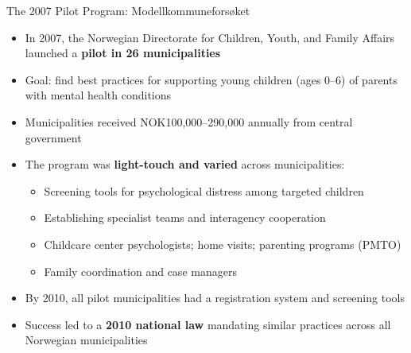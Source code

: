 \documentclass[aspectratio=169]{beamer}
\begin{document}
\begin{frame}{The 2007 Pilot Program: Modellkommunefors\o{}ket}
  \begin{itemize}
    \item In 2007, the Norwegian Directorate for Children, Youth, and Family Affairs launched a \textbf{pilot in 26 municipalities}
    \item Goal: find best practices for supporting young children (ages 0--6) of parents with mental health conditions
    \item Municipalities received NOK100,000--290,000 annually from central government
    \item The program was \textbf{light-touch and varied} across municipalities:
    \begin{itemize}
      \item Screening tools for psychological distress among targeted children
      \item Establishing specialist teams and interagency cooperation
      \item Childcare center psychologists; home visits; parenting programs (PMTO)
      \item Family coordination and case managers
    \end{itemize}
    \item By 2010, all pilot municipalities had a registration system and screening tools
    \item Success led to a \textbf{2010 national law} mandating similar practices across all Norwegian municipalities
  \end{itemize}
\end{frame}
\end{document}
